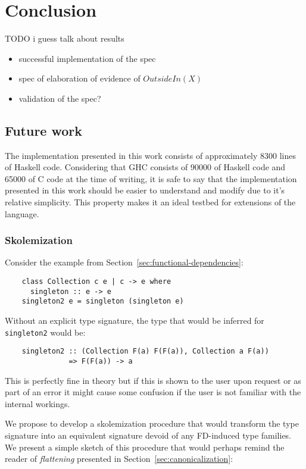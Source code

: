 \chapter{Conclusion}
\label{cha:conclusion}

TODO i guess talk about results
\begin{itemize}
    \item successful implementation of the spec
    \item spec of elaboration of evidence of $OutsideIn(X)$
    \item validation of the spec?
\end{itemize}

\section{Future work}

The implementation presented in this work consists of approximately 8300 lines
of Haskell code. Considering that GHC consists of 90000 of Haskell code and
65000 of C code at the time of writing, it is safe to say that the
implementation presented in this work should be easier to understand and modify
due to it's relative simplicity. This property makes it an ideal testbed for
extensions of the language.

\subsection{Skolemization}

Consider the example from Section~\ref{sec:functional-dependencies}:
\begin{verbatim}
    class Collection c e | c -> e where
      singleton :: e -> e
    singleton2 e = singleton (singleton e)
\end{verbatim}

Without an explicit type signature, the type that would be inferred for
\texttt{singleton2} would be:

\begin{verbatim}
    singleton2 :: (Collection F(a) F(F(a)), Collection a F(a))
               => F(F(a)) -> a
\end{verbatim}

This is perfectly fine in theory but if this is shown to the user upon request
or as part of an error it might cause some confusion if the user is not familiar
with the internal workings.

We propose to develop a skolemization procedure that would transform the type
signature into an equivalent signature devoid of any FD-induced type families.
We present a simple sketch of this procedure that would perhaps remind the
reader of \textit{flattening} presented in Section~\ref{sec:canonicalization}:

